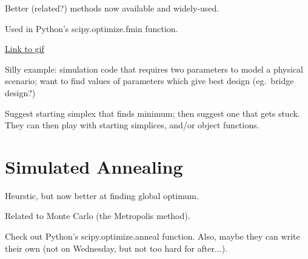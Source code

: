 \documentclass{article}
\begin{document}
  Better (related?) methods now available
  and widely-used.

  Used in Python's scipy.optimize.fmin function.

  \href{http://userpages.umbc.edu/~rostamia/nelder-mead.html}{Link to gif}

  Silly example: simulation code that requires two parameters
  to model a physical scenario; want to find values of parameters
  which give best design (eg.\ bridge design?)

  Suggest starting simplex that finds minimum; then
  suggest one that gets stuck. They can then play
  with starting simplices, and/or object functions.

\section*{Simulated Annealing}
  Heurstic, but now better at finding
  global optimum.

  Related to Monte Carlo (the Metropolis method).

  Check out Python's scipy.optimize.anneal function.
  Also, maybe they can write their own (not on Wednesday,
  but not too hard for after...).
\end{document}
